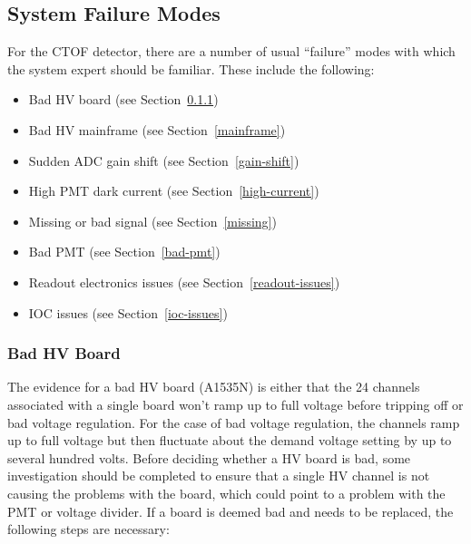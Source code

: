 \documentclass[12pt]{article}
\begin{document}
\subsection{System Failure Modes}
\label{repairs}

For the CTOF detector, there are a number of usual ``failure'' modes with which the system expert should
be familiar. These include the following:

\begin{itemize}
\item Bad HV board (see Section~\ref{board-swap})
\item Bad HV mainframe (see Section~\ref{mainframe})
\item Sudden ADC gain shift (see Section~\ref{gain-shift})
\item High PMT dark current (see Section~\ref{high-current})
\item Missing or bad signal (see Section~\ref{missing})
\item Bad PMT (see Section~\ref{bad-pmt})
\item Readout electronics issues (see Section~\ref{readout-issues})
\item IOC issues (see Section~\ref{ioc-issues})
\end{itemize}

\subsubsection{Bad HV Board}
\label{board-swap}

The evidence for a bad HV board (A1535N) is either that the 24 channels associated with a single board won't
ramp up to full voltage before tripping off or bad voltage regulation. For the case of bad voltage regulation, the
channels ramp up to full voltage but then fluctuate about the demand voltage setting by up to several hundred 
volts. Before deciding whether a HV board is bad, some investigation should be completed to ensure that a single
HV channel is not causing the problems with the board, which could point to a problem with the PMT or voltage
divider. If a board is deemed bad and needs to be replaced, the following steps are necessary:
\end{document}
